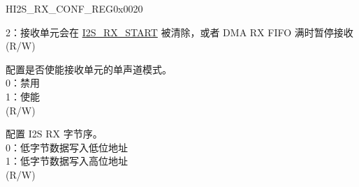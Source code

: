 \begin{register}{H}{I2S\_RX\_CONF\_REG}{0x0020}
\begin{regdesc}
\begin{reglist}
2：接收单元会在 \hyperref[fielddesc:I2SRXSTART]{I2S\_RX\_START} 被清除，或者 DMA RX FIFO 满时暂停接收\\
(R/W)
\label{fielddesc:I2SRXMONO}\item [I2S\_RX\_MONO] 配置是否使能接收单元的单声道模式。 \\
0：禁用\\
1：使能\\
(R/W)
\label{fielddesc:I2SRXBIGENDIAN}\item [I2S\_RX\_BIG\_ENDIAN] 配置 I2S RX 字节序。 \\
0：低字节数据写入低位地址\\
1：低字节数据写入高位地址\\
(R/W)

\item [见下页...]
\end{reglist}\end{regdesc}
\end{register}
\addtocounter{Regfloat}{-1}
